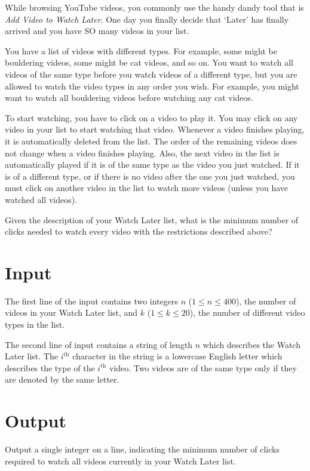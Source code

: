 
While browsing YouTube videos, you commonly use the handy dandy tool that is 
\textit{Add Video to Watch Later}. One day you finally decide that `Later' has finally arrived and
you have SO many videos in your list.

You have a list of videos with different types. For example, some
might be bouldering videos, some might be cat videos, and so on. You
want to watch all videos of the same type before you watch videos of a
different type, but you are allowed to watch the video types in any
order you wish. For example, you might want to watch all bouldering
videos before watching any cat videos.

To start watching, you have to click on a video to play it.  You may
click on any video in your list to start watching that video.  Whenever
a video finishes playing, it is automatically deleted
from the list.  The order of the remaining videos does not change when
a video finishes playing.  Also, the next
video in the list is automatically played if it is of the same type as
the video you just watched.  If it is of a different type, or if there
is no video after the one you just watched, you must click on another
video in the list to watch more videos (unless you have watched all
videos).

Given the description of your Watch Later list, what is the minimum
number of clicks needed to watch every video with the restrictions
described above?

\section*{Input}
The first line of the input contains two integers $n$
($1 \leq n \leq 400$), the number of videos in your Watch Later list,
and $k$ ($1 \leq k \leq 20$), the number of different video types in
the list.

The second line of input contains a string of length $n$ which
describes the Watch Later list. The $i^\textrm{th}$ character in the
string is a lowercase English letter which describes the type of the
$i^\textrm{th}$ video. Two videos are of the same type only if they
are denoted by the same letter.

\section*{Output}

Output a single integer on a line, indicating the minimum number of
clicks required to watch all videos currently in your Watch Later
list.
